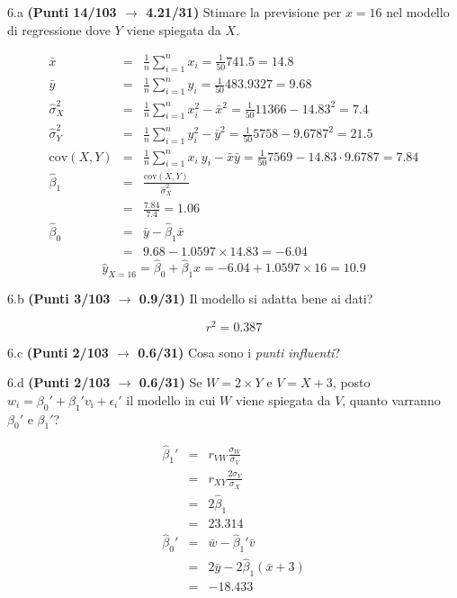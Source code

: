 \documentclass[
  11pt,
]{book}
\theoremstyle{mytheoremstyle}
\theoremstyle{mydefstyle}
\newenvironment{sol}
  {
  \begin{tcolorbox}[enhanced,breakable,arc=0.1mm,boxrule=1pt,colback=white,colframe=iblue,
  title=\bf \fontfamily{lmss}\selectfont \hspace{.5 cm} Soluzione,drop fuzzy shadow]

}{
\end{tcolorbox}
  }
\begin{document}
6.a \textbf{(Punti 14/103 \(\rightarrow\) 4.21/31)} Stimare la previsione per \(x=16\) nel modello di regressione dove \(Y\) viene spiegata da \(X\).

\begin{sol}
\begin{eqnarray*}
           \bar x &=&\frac 1 n\sum_{i=1}^n x_i = \frac {1}{ 50 }  741.5 =  14.8 \\
           \bar y &=&\frac 1 n\sum_{i=1}^n y_i = \frac {1}{ 50 }  483.9327 =  9.68 \\
           \hat\sigma_X^2&=&\frac 1 n\sum_{i=1}^n x_i^2-\bar x^2=\frac {1}{ 50 }  11366  - 14.83 ^2= 7.4 \\
           \hat\sigma_Y^2&=&\frac 1 n\sum_{i=1}^n y_i^2-\bar y^2=\frac {1}{ 50 }  5758  - 9.6787 ^2= 21.5 \\
           \text{cov}(X,Y)&=&\frac 1 n\sum_{i=1}^n x_i~y_i-\bar x\bar y=\frac {1}{ 50 }  7569 - 14.83 \cdot 9.6787 = 7.84 \\
           \hat\beta_1 &=& \frac{\text{cov}(X,Y)}{\hat\sigma_X^2} \\
                    &=& \frac{ 7.84 }{ 7.4 }  =  1.06 \\
           \hat\beta_0 &=& \bar y - \hat\beta_1 \bar x\\
                    &=&  9.68 - 1.0597 \times  14.83 = -6.04 
         \end{eqnarray*}\[\hat y_{X= 16 }=\hat\beta_0+\hat\beta_1 x= -6.04 + 1.0597 \times 16 = 10.9 \]

\end{sol}

6.b \textbf{(Punti 3/103 \(\rightarrow\) 0.9/31)} Il modello si adatta bene ai dati?

\[r^2=0.387\]

6.c \textbf{(Punti 2/103 \(\rightarrow\) 0.6/31)} Cosa sono i \emph{punti influenti}?

6.d \textbf{(Punti 2/103 \(\rightarrow\) 0.6/31)} Se \(W=2\times Y\) e \(V=X+3\), posto \(w_i=\beta_0'+\beta_1'v_ì +\epsilon_i'\)
il modello in cui \(W\) viene spiegata da \(V\), quanto varranno \(\beta_0'\) e \(\beta_1'\)?

\begin{sol}
\begin{eqnarray*}
   \hat\beta_1' &=&  r_{VW}\frac{\sigma_W}{\sigma_V} \\
            &=&  r_{XY}\frac{2\sigma_Y}{\sigma_X} \\
            &=& 2\hat\beta_1\\
            &=& 23.314\\
  \hat\beta_0' &=& \bar w - \hat\beta_1'\bar v\\
            &=& 2\bar y-2\hat\beta_1(\bar x + 3)\\
            &=& -18.433
\end{eqnarray*}

\end{sol}
\end{document}
